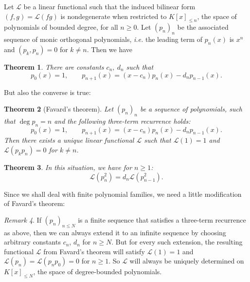 \documentclass{amsart}
\newcommand{\ie}{{\it i.e. }}
\renewcommand{\L}{\mathcal{L}}
\theoremstyle{plain}
\newtheorem{theorem}{Theorem}[section]
\theoremstyle{definition}
\theoremstyle{remark}
\newtheorem{remark}[theorem]{Remark}
\begin{document}
Let $\L$ be a linear functional such that the induced bilinear form $(f,g)=\L(fg)$ is nondegenerate when restricted to $K[x]_{\leq n}$, the space of polynomials of bounded degree, for all $n\geq 0$. Let $(p_n)_n$ be the associated sequence of monic orthogonal polynomials, \ie the leading term of $p_n(x)$ is $x^n$ and $(p_k,p_{n})=0$ for $k\neq n$. Then we have
\begin{theorem} \cite[Thm.~4.1]{Chihara} There are constants $c_n,\: d_n$ such that
\begin{equation*}
 p_0(x) = 1,\qquad  p_{n+1}(x) = (x-c_n)p_n(x) - d_np_{n-1}(x).
\end{equation*}
\end{theorem}
But also the converse is true:
\begin{theorem}[Favard's theorem] \cite[Thm.~4.4]{Chihara} \label{favard}
Let $(p_n)_n$ be a sequence of polynomials, such that $\deg p_n =n$ and the following three-term recurrence holds:
$$p_0(x) = 1,\qquad  p_{n+1}(x) = (x-c_n)p_n(x) - d_np_{n-1}(x).
$$
Then there exists a unique linear functional $\L$ such that $\L(1)=1$ and $\L(p_kp_{n})=0$ for $k\neq n$. 
\end{theorem}
\begin{theorem}\cite[Thm.~4.2]{Chihara} \label{generalLnorm}
In this situation, we have for $n\geq 1$: $$\L(p_n^2) = d_n\L(p_{n-1}^2).$$
\end{theorem}
Since we shall deal with finite polynomial families, we need a little modification of Favard's theorem:
\begin{remark} \label{finiteFarvard}
If $(p_n)_{n\leq N}$ is a finite sequence that satisfies a three-term recurrence as above, then we can always extend it to an infinite sequence by choosing arbitrary constants $c_n$, $d_n$ for $n\geq N$. But for every such extension, the resulting functional $\L$ from Favard's theorem will satisfy $\L(1) =1$ and $\L(p_n)=\L(p_np_0)=0$ for $n\geq 1$. So $\L$ will always be uniquely determined on $K[x]_{\leq N}$, the space of degree-bounded polynomials.
\end{remark}
\end{document}

